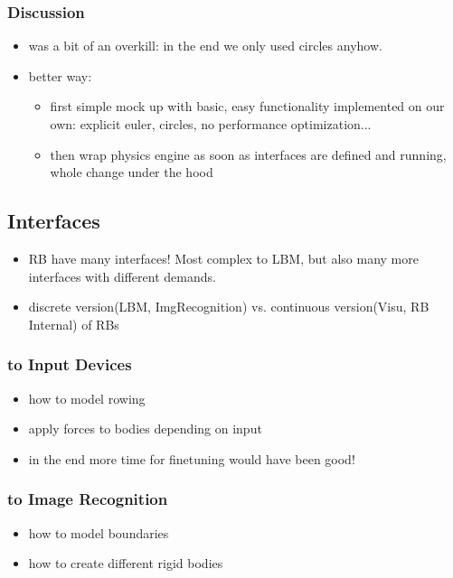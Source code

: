 \subsubsection{Discussion}
\begin{itemize}
\item was a bit of an overkill: in the end we only used circles anyhow.
\item better way: 
\begin{itemize}
\item first simple mock up with basic, easy functionality implemented on our own: explicit euler, circles, no performance optimization...
\item then wrap physics engine as soon as interfaces are defined and running, whole change under the hood
\end{itemize}
\end{itemize}

\subsection{Interfaces}
\begin{itemize}
\item RB have many interfaces! Most complex to LBM, but also many more interfaces with different demands.
\item discrete version(LBM, ImgRecognition) vs. continuous version(Visu, RB Internal) of RBs
\end{itemize}
\subsubsection{to Input Devices}
\begin{itemize}
\item how to model rowing
\item apply forces to bodies depending on input
\item in the end more time for finetuning would have been good!
\end{itemize}
\subsubsection{to Image Recognition}
\begin{itemize}
\item how to model boundaries
\item how to create different rigid bodies
\end{itemize}
